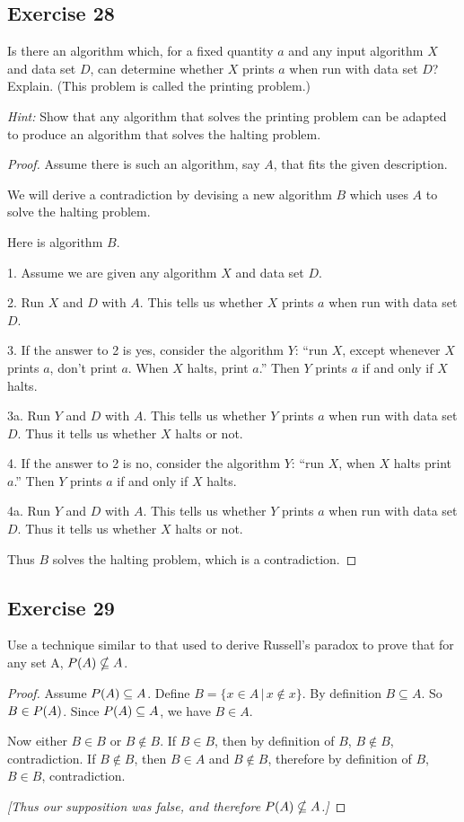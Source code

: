 \documentclass[14pt]{extarticle}
\let\mathscr\relax
\newcommand{\ps}{\mathscr{P}}
\begin{document}
\subsection{Exercise 28}
Is there an algorithm which, for a fixed quantity $a$ and any input algorithm $X$ and data set $D$, can determine 
whether $X$ prints $a$ when run with data set $D$? Explain. (This problem is called the printing problem.)

{\it Hint:} Show that any algorithm that solves the printing problem can be adapted to produce an algorithm 
that solves the halting problem.

\begin{proof}
Assume there is such an algorithm, say $A$, that fits the given description.

We will derive a contradiction by devising a new algorithm $B$ which uses $A$ to solve the halting problem.

Here is algorithm $B$. 

1. Assume we are given any algorithm $X$ and data set $D$.

2. Run $X$ and $D$ with $A$. This tells us whether $X$ prints $a$ when run with data set $D$.

3. If the answer to 2 is yes, consider the algorithm $Y$: ``run $X$, except whenever $X$ prints $a$, don't print $a$. 
When $X$ halts, print $a$.'' Then $Y$ prints $a$ if and only if $X$ halts.

3a. Run $Y$ and $D$ with $A$. This tells us whether $Y$ prints $a$ when run with data set $D$. Thus it tells us 
whether $X$ halts or not.

4. If the answer to 2 is no, consider the algorithm $Y$: ``run $X$, when $X$ halts print $a$.'' Then $Y$ prints $a$ 
if and only if $X$ halts.

4a. Run $Y$ and $D$ with $A$. This tells us whether $Y$ prints $a$ when run with data set $D$. Thus it tells us 
whether $X$ halts or not.

Thus $B$ solves the halting problem, which is a contradiction.
\end{proof}

\subsection{Exercise 29}
Use a technique similar to that used to derive Russell’s paradox to prove that for any set A, \(\ps(A) \nsubseteq A\).

\begin{proof}
Assume \(\ps(A) \subseteq A\). Define \(B = \{x \in A \, | \, x \notin x\}\). By definition \(B \subseteq A\). 
So \(B \in \ps(A)\). Since \(\ps(A) \subseteq A\), we have \(B \in A\).

Now either $B \in B$ or $B \notin B$. If $B \in B$, then by definition of $B$, \(B \notin B\), contradiction.
If \(B \notin B\), then \(B \in A\) and \(B \notin B\), therefore by definition of $B$, \(B \in B\), contradiction.

{\it [Thus our supposition was false, and therefore \(\ps(A) \nsubseteq A\).]}
\end{proof}
\end{document}

